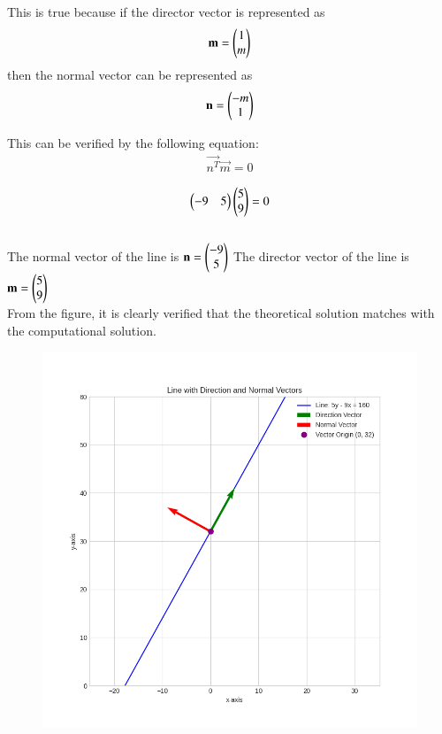 \documentclass[journal]{IEEEtran}
\begin{document}
This is true because if the director vector is represented as 
\begin{align}
\mathbf{m}  = \begin{pmatrix}1 \\ m\end{pmatrix}    
\end{align}
then the normal vector can be represented as 
\begin{align}
\mathbf{n} = \begin{pmatrix}-m \\ 1\end{pmatrix}
\end{align}

This can be verified by the following equation:
\begin{align}
\vec{n^T}\vec{m} = 0
\end{align}

\begin{align}
\begin{pmatrix}-9 & 5\end{pmatrix}\begin{pmatrix}5 \\ 9\end{pmatrix} = 0
\end{align}\\



The normal vector of the line is $\mathbf{n} = \begin{pmatrix}-9 \\ 5\end{pmatrix}$
The director vector of the line is $\mathbf{m} = \begin{pmatrix}5 \\ 9\end{pmatrix}$\\

From the figure, it is clearly verified that the theoretical solution matches with the computational solution.\\
\begin{figure}[h!]
    \centering
    \includegraphics[height=0.5\textheight, keepaspectratio]{figs/fig.png}
    \label{figure_1}
\end{figure}
\end{document}
